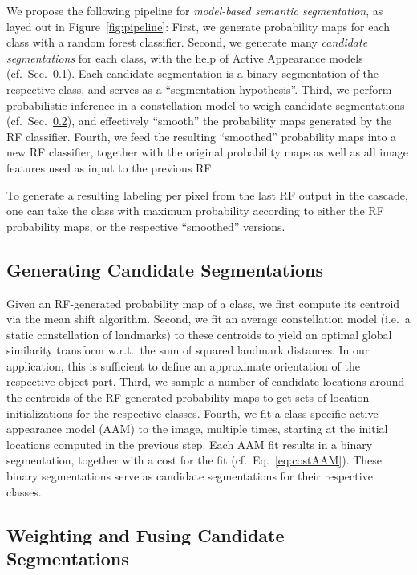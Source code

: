 \documentclass[10pt,twocolumn,letterpaper]{article}
\begin{document}
We propose the following pipeline for \emph{model-based semantic segmentation}, as layed out in Figure~\ref{fig:pipeline}: 
%
First, we generate probability maps for each class with a random forest classifier.
%
Second, we generate many \emph{candidate segmentations} for each class, with the help of Active Appearance models (cf.\ Sec.\ \ref{subsec:hyps}). 
Each candidate segmentation is a binary segmentation of the respective class, and serves as a ``segmentation hypothesis''. 
%
Third, we perform probabilistic inference in a constellation model to weigh candidate segmentations (cf.\ Sec.\ \ref{subsec:weightsAndFusion}), and effectively ``smooth'' the probability maps generated by the RF classifier.  
%
Fourth, we feed the resulting ``smoothed'' probability maps into a new RF classifier, together with the original probability maps as well as all image features used as input to the previous RF. 

To generate a resulting labeling per pixel from the last RF output in the cascade, one can take the class with maximum probability according to either the RF probability maps, or the respective ``smoothed'' versions. 


\subsection{Generating Candidate Segmentations}
\label{subsec:hyps}
%
Given an RF-generated probability map of a class, we
first compute its centroid via the mean shift algorithm. 
%
Second, we fit an average constellation model (i.e.\ a static constellation of landmarks) to these centroids to yield an optimal global similarity transform w.r.t.\ the sum of squared landmark distances. In our application, this is sufficient to define an approximate orientation of the respective object part. 
%
Third, we sample a number of candidate locations around the centroids of the RF-generated probability maps to get sets of location initializations for the respective classes. 
%
Fourth, we fit a class specific active appearance model (AAM) to the image, multiple times, starting at the initial locations computed in the previous step. 
%
Each AAM fit results in a binary segmentation, together with a cost for the fit (cf.\ Eq.\ \eqref{eq:costAAM}). 
%
These binary segmentations serve as candidate segmentations for their respective classes. 

\subsection{Weighting and Fusing Candidate Segmentations}
\label{subsec:weightsAndFusion}
\end{document}
